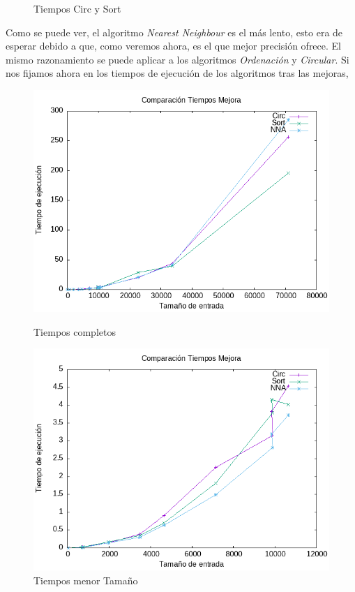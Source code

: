 \documentclass[11pt,openany]{book}
\begin{document}
\begin{figure}[H]
\begin{minipage}{.48\textwidth}
            \caption{Tiempos Circ y Sort}
            \label{fig:ordered}
      \end{minipage}
\end{figure}
Como se puede ver, el algoritmo \textit{Nearest Neighbour} es el más lento,
esto era de esperar debido a que, como veremos ahora, es el que mejor precisión
ofrece. El mismo razonamiento se puede aplicar a los algoritmos \textit{Ordenación}
y \textit{Circular}.
Si nos fijamos ahora en los tiempos de ejecución de los algoritmos tras las mejoras,

\begin{figure}[H]
      \centering
      \begin{minipage}{.48\textwidth}
            \centering
            \includegraphics[width=1\linewidth]{assets/Img/TiemposMejora.png}
            \caption{Tiempos completos}
            \label{fig:nearest}
      \end{minipage}%
      \begin{minipage}{.48\textwidth}
            \centering
            \includegraphics[width=1\linewidth]{assets/Img/TiemposMejoraChico.png}
            \caption{Tiempos menor Tamaño}
            \label{fig:ordered}
      \end{minipage}
\end{figure}
\end{document}
